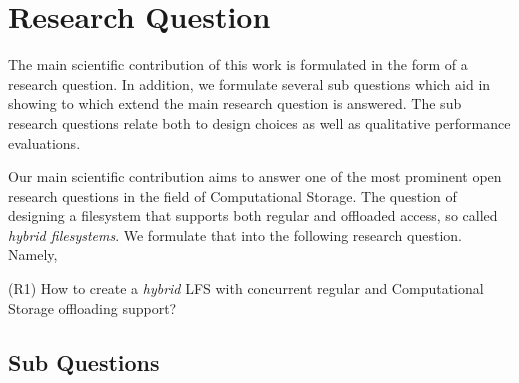 \section{Research Question}

The main scientific contribution of this work is formulated in the form of a
research question. In addition, we formulate several sub questions which aid in
showing to which extend the main research question is answered. The sub research
questions relate both to design choices as well as qualitative performance
evaluations.

Our main scientific contribution aims to answer one of the most prominent open
research questions in the field of Computational Storage. The question of
designing a filesystem that supports both regular and offloaded access, so
called \textit{hybrid filesystems}. We formulate that into the following
research question. Namely,

\begin{displayquote}
    (R1) How to create a \textit{hybrid} LFS with concurrent regular and 
    Computational Storage offloading support?
\end{displayquote}

\subsection{Sub Questions}


